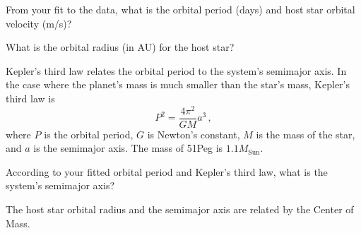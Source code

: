 %

\begin{steps}
	\item From your fit to the data, what is the orbital period (days) and host star orbital velocity (m/s)?
	
	\item What is the orbital radius (in AU) for the host star?
\end{steps}

Kepler's third law relates the orbital period to the system's semimajor axis. In the case where the planet’s mass is much smaller than the star’s mass, Kepler's third law is
\begin{equation}
 P^2=\frac{4 \pi^2}{GM} a^3 \,,
\end{equation}
where $P$ is the orbital period, $G$ is Newton's constant, $M$ is the mass of the star, and $a$ is the semimajor axis. The mass of 51Peg is $1.1 M_\textrm{Sun}$.

\begin{steps}
	\item According to your fitted orbital period and Kepler's third law, what is the system's semimajor axis?
\end{steps}

The host star orbital radius and the semimajor axis are related by the Center of Mass.


